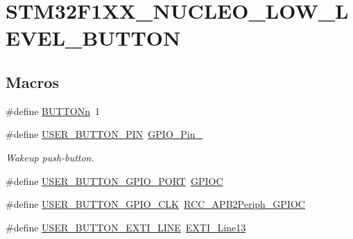\hypertarget{group___s_t_m32_f1_x_x___n_u_c_l_e_o___l_o_w___l_e_v_e_l___b_u_t_t_o_n}{}\section{S\+T\+M32\+F1\+X\+X\+\_\+\+N\+U\+C\+L\+E\+O\+\_\+\+L\+O\+W\+\_\+\+L\+E\+V\+E\+L\+\_\+\+B\+U\+T\+T\+ON}
\label{group___s_t_m32_f1_x_x___n_u_c_l_e_o___l_o_w___l_e_v_e_l___b_u_t_t_o_n}
\subsection*{Macros}
\begin{DoxyCompactItemize}
\item 
\#define \mbox{\hyperlink{group___s_t_m32_f1_x_x___n_u_c_l_e_o___l_o_w___l_e_v_e_l___b_u_t_t_o_n_ga43d47e509ada64329393005c3be15d64}{B\+U\+T\+T\+O\+Nn}}~1
\item 
\#define \mbox{\hyperlink{group___s_t_m32_f1_x_x___n_u_c_l_e_o___l_o_w___l_e_v_e_l___b_u_t_t_o_n_ga34df6915e3013d6a0c74131d3946b659}{U\+S\+E\+R\+\_\+\+B\+U\+T\+T\+O\+N\+\_\+\+P\+IN}}~\mbox{\hyperlink{group___g_p_i_o__pins__define_ga4155a41c433f3657b9c79cfbd4240966}{G\+P\+I\+O\+\_\+\+Pin\+\_}}
\begin{DoxyCompactList}\small\item\em Wakeup push-\/button. \end{DoxyCompactList}\item 
\#define \mbox{\hyperlink{group___s_t_m32_f1_x_x___n_u_c_l_e_o___l_o_w___l_e_v_e_l___b_u_t_t_o_n_gae2e6fc2fdfda22b4eed3667375a8bd81}{U\+S\+E\+R\+\_\+\+B\+U\+T\+T\+O\+N\+\_\+\+G\+P\+I\+O\+\_\+\+P\+O\+RT}}~\mbox{\hyperlink{group___peripheral__declaration_ga2dca03332d620196ba943bc2346eaa08}{G\+P\+I\+OC}}
\item 
\#define \mbox{\hyperlink{group___s_t_m32_f1_x_x___n_u_c_l_e_o___l_o_w___l_e_v_e_l___b_u_t_t_o_n_gac94af9563fb54d762f1d5351593ee218}{U\+S\+E\+R\+\_\+\+B\+U\+T\+T\+O\+N\+\_\+\+G\+P\+I\+O\+\_\+\+C\+LK}}~\mbox{\hyperlink{group___a_p_b2__peripheral_gaf1f4b467becee1ff31ba2c54328a0115}{R\+C\+C\+\_\+\+A\+P\+B2\+Periph\+\_\+\+G\+P\+I\+OC}}
\item 
\#define \mbox{\hyperlink{group___s_t_m32_f1_x_x___n_u_c_l_e_o___l_o_w___l_e_v_e_l___b_u_t_t_o_n_gac41d04c2244ba780e4749991c85d1e9a}{U\+S\+E\+R\+\_\+\+B\+U\+T\+T\+O\+N\+\_\+\+E\+X\+T\+I\+\_\+\+L\+I\+NE}}~\mbox{\hyperlink{group___e_x_t_i___lines_gae382388ac34b78917a7bd06562e35c42}{E\+X\+T\+I\+\_\+\+Line13}}

\end{DoxyCompactItemize}
